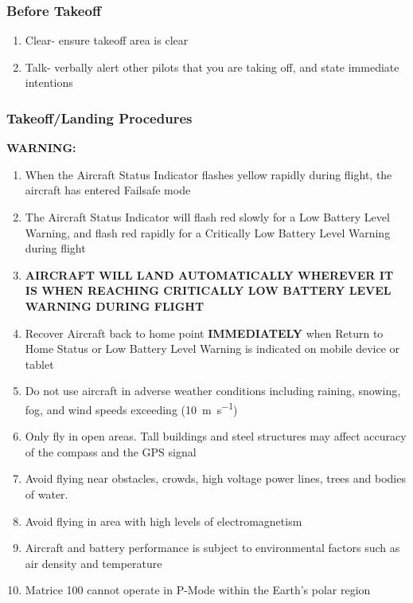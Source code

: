 \subsubsection{Before Takeoff}
\begin{enumerate}
\setlength{\itemsep}{0em}
\setlength{\parskip}{0em}
\item Clear- ensure takeoff area is clear
\item Talk- verbally alert other pilots that you are taking off, and state immediate intentions
\end{enumerate}


\clearpage
\subsubsection{Takeoff/Landing Procedures}
\textbf{WARNING:}
\begin{enumerate}
\setlength{\itemsep}{0em}
\setlength{\parskip}{0em}
\item When the Aircraft Status Indicator flashes yellow rapidly during flight, the aircraft has entered Failsafe mode
\item The Aircraft Status Indicator will flash red slowly for a Low Battery Level Warning, and flash red rapidly for a Critically Low Battery Level Warning during flight
\item \textbf{AIRCRAFT WILL LAND AUTOMATICALLY WHEREVER IT IS WHEN REACHING CRITICALLY LOW BATTERY LEVEL WARNING DURING FLIGHT}
\item Recover Aircraft back to home point \textbf{IMMEDIATELY} when Return to Home Status or Low Battery Level Warning is indicated on mobile device or tablet
\item Do not use aircraft in adverse weather conditions including raining, snowing, fog, and wind speeds exceeding (\SI{10}{\meter\per\second})
\item Only fly in open areas. Tall buildings and steel structures may affect accuracy of the compass and the GPS signal
\item Avoid flying near obstacles, crowds, high voltage power lines, trees and bodies of water. 
\item Avoid flying in area with high levels of electromagnetism
\item Aircraft and battery performance is subject to environmental factors such as air density and temperature
\item Matrice 100 cannot operate in P-Mode within the Earth’s polar region


\end{enumerate}
